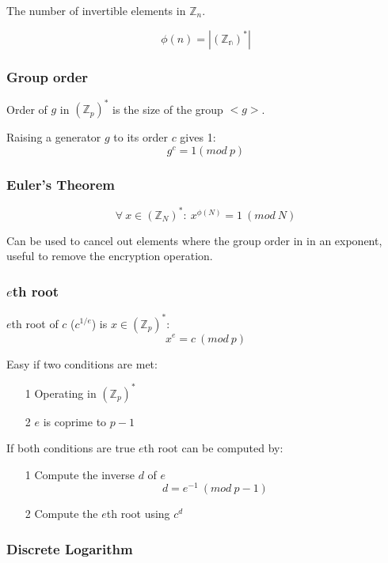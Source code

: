 \documentclass[a4paper]{article}
\begin{document}
The number of invertible elements in $\mathbb{Z}_{n}$.

\[
  \phi(n) = |(\mathbb{Z_{n}})^{*}|
\]

\subsubsection{Group order}

Order of $g$ in $(\mathbb{Z}_{p})^{*}$ is the size of the group $<g>$.

Raising a generator $g$ to its order $c$ gives 1:
\[
  g^{c} = 1 (mod \: p)
\]

\subsubsection{Euler's Theorem}

\[
  \forall \: x \in (\mathbb{Z}_{N})^{*}: \: x^{\phi(N)} = 1 \: (mod \: N)
\]

Can be used to cancel out elements where the group order in in an exponent,
useful to remove the encryption operation.

\subsubsection{$e$th root}

$e$th root of $c$ ($c^{1/e}$) is $x \in (\mathbb{Z}_{p})^{*}$:
\[
  x^{e} = c \: (mod \: p)
\]


Easy if two conditions are met:
\begin{enumerate}
  \item[1] Operating in $(\mathbb{Z}_{p})^{*}$
  \item[2] $e$ is coprime to $p-1$
\end{enumerate}

If both conditions are true $e$th root can be computed by:
\begin{enumerate}
  \item[1]
    Compute the inverse $d$ of $e$ \\
    \[
      d = e^{-1} \: (mod \: p - 1)
    \]

  \item[2]
    Compute the $e$th root using $c^{d}$

\end{enumerate}

\subsubsection{Discrete Logarithm}
\end{document}
